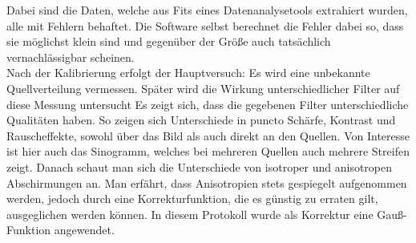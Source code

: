 Dabei sind die Daten, welche aus Fits eines Datenanalysetools extrahiert wurden, alle mit Fehlern behaftet. Die Software selbst berechnet die Fehler dabei so, dass
sie möglichst klein sind und gegenüber der Größe auch tatsächlich vernachlässigbar scheinen.\\
Nach der Kalibrierung erfolgt der Hauptversuch: Es wird eine unbekannte Quellverteilung vermessen. Später wird die Wirkung unterschiedlicher Filter auf diese Messung untersucht
Es zeigt sich, dass die gegebenen Filter unterschiedliche Qualitäten haben. So zeigen sich Unterschiede in puncto Schärfe, Kontrast und Rauscheffekte, sowohl über das Bild als auch direkt an den Quellen.
Von Interesse ist hier auch das Sinogramm, welches bei mehreren Quellen auch mehrere Streifen zeigt. 
Danach schaut man sich die Unterschiede von isotroper und anisotropen Abschirmungen an. Man erfährt, dass Anisotropien stets gespiegelt aufgenommen werden, jedoch durch eine 
Korrekturfunktion, die es günstig zu erraten gilt, ausgeglichen werden können. 
In diesem Protokoll wurde als Korrektur eine Gauß-Funktion angewendet.